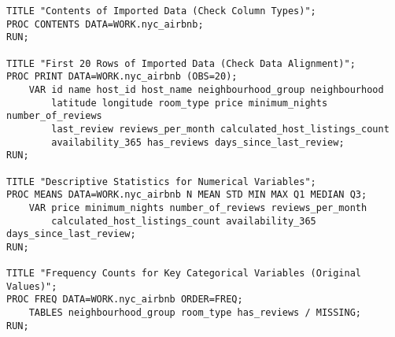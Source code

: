 \documentclass{article}
\begin{document}
\begin{lstlisting}[style=SASStyle, caption=Data Validation and Initial Exploration]
TITLE "Contents of Imported Data (Check Column Types)";
PROC CONTENTS DATA=WORK.nyc_airbnb;
RUN;

TITLE "First 20 Rows of Imported Data (Check Data Alignment)";
PROC PRINT DATA=WORK.nyc_airbnb (OBS=20);
    VAR id name host_id host_name neighbourhood_group neighbourhood
        latitude longitude room_type price minimum_nights number_of_reviews
        last_review reviews_per_month calculated_host_listings_count
        availability_365 has_reviews days_since_last_review;
RUN;

TITLE "Descriptive Statistics for Numerical Variables";
PROC MEANS DATA=WORK.nyc_airbnb N MEAN STD MIN MAX Q1 MEDIAN Q3;
    VAR price minimum_nights number_of_reviews reviews_per_month
        calculated_host_listings_count availability_365 days_since_last_review;
RUN;

TITLE "Frequency Counts for Key Categorical Variables (Original Values)";
PROC FREQ DATA=WORK.nyc_airbnb ORDER=FREQ;
    TABLES neighbourhood_group room_type has_reviews / MISSING;
RUN;
\end{lstlisting}
\end{document}
